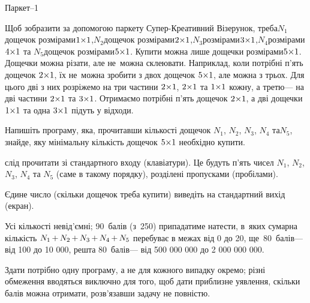 \documentclass[14pt,a4paper]{extarticle}
\def\dib#1{\,#1\discretionary{}{\mbox{$#1$}}{}\,}
\begin{document}
\begin{problemAllDefault}{Паркет--1}

{

Щоб зобразити за допомогою паркету Супер-Креативний Візерунок, треба\linebreak[1]
$N_1$\nolinebreak[3] дощечок розмірами\nolinebreak[2] $1{\times}1$,\linebreak[1]
$N_2$\nolinebreak[3] дощечок розмірами\nolinebreak[2] $2{\times}1$,\linebreak[1]
$N_3$\nolinebreak[3] розмірами\nolinebreak[1] $3{\times}1$,\linebreak[1]
$N_4$\nolinebreak[4] розмірами\nolinebreak[1] $4{\times}1$ та 
$N_5$\nolinebreak[3] дощечок розмірами\nolinebreak[3] $5{\times}1$. 
Купити можна лише дощечки розмірами\nolinebreak[2] $5{\times}1$. Дощечки можна різати, але не~можна склеювати. Наприклад, коли потрібні п’ять дощечок $2{\times}1$, їх не~можна зробити з двох дощечок $5{\times}1$, але можна з трьох. Для цього дві з них розріжемо на три частини $2{\times}1$, $2{\times}1$ та $1{\times}1$ кожну, а третю\nolinebreak[3] --- на дві частини $2{\times}1$ та $3{\times}1$. Отримаємо потрібні п’ять дощечок $2{\times}1$, а дві дощечки $1{\times}1$ та одна $3{\times}1$ підуть у відходи.

}

Напишіть програму, яка, прочитавши кількості дощечок $N_1$, $N_2$, $N_3$, $N_4$ та\nolinebreak[3] $N_5$, знайде, яку мінімальну кількість дощечок $5{\times}1$ необхідно купити.

\InputFile	слід прочитати зі стандартного входу (клавіатури). Це будуть п’ять чисел $N_1$, $N_2$, $N_3$, $N_4$ та $N_5$ (саме в такому порядку), розділені пропусками (пробілами).

\OutputFile	Єдине число (скільки дощечок треба купити) виведіть на стандартний вихід (екран).


\Examples
\begin{exampleSimple}{5em}{3em}%
%
%
\end{exampleSimple}

\Scoring	Усі кількості невід’ємні; 90~балів (з~250) припадатиме на\nolinebreak[3] тести, в~яких сумарна кількість $N_1\dib{{+}}N_2\dib{{+}}N_3\dib{{+}}N_4\dib{{+}}N_5$ перебуває в межах від 0 до 20, ще~80~балів\nolinebreak[3] --- від 100 до 10 000, решта 80~балів\nolinebreak[3] --- від 500 000 000 до 2 000 000 000. 

Здати потрібно одну програму, а не для кожного випадку окремо; різні обмеження вводяться виключно для того, щоб дати приблизне уявлення, скільки балів можна отримати, розв’язавши задачу не повністю.



\end{problemAllDefault}
	
\end{document}
